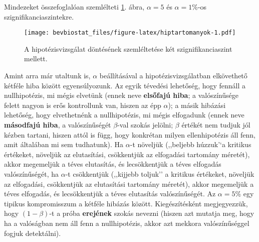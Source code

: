 \documentclass[]{book}
\begin{document}
Mindezeket összefoglalóan szemlélteti \ref{fig:hiptartomanyok}. ábra,
\(\alpha=5\) és \(\alpha=1\)\%-os szignifikanciaszintekre.

\begin{figure}
\centering
\texttt{[image: bevbiostat\_files/figure-latex/hiptartomanyok-1.pdf]}
\caption{\label{fig:hiptartomanyok}A hipotézisvizsgálat döntésének
szemléltetése két szignifikanciaszint mellett.}
\end{figure}

Amint arra már utaltunk is, \(\alpha\) beállításával a
hipotézisvizsgálatban elkövethető kétféle hiba között egyensúlyozunk. Az
egyik tévedési lehetőség, hogy fennáll a nullhipotézis, mi mégis
elvetünk (ennek neve \textbf{elsőfajú hiba}; a valószínűsége felett
nagyon is erős kontrollunk van, hiszen az épp \(\alpha\)); a másik
hibázási lehetőség, hogy elvethetnénk a nullhipotézis, mi mégis
elfogadunk (ennek neve \textbf{másodfajú hiba}, a valószínűségét
\(\beta\)-val szokás jelölni; \(\beta\) értékét nem tudjuk jól kézben
tartani, hiszen attól is függ, hogy konkrétan milyen ellenhipotézis áll
fenn, amit általában mi sem tudhatunk). Ha \(\alpha\)-t növeljük
(,,beljebb húzzuk'`a kritikus értékeket, növeljük az elutasítási,
csökkentjük az elfogadási tartomány méretét), akkor megemeljük a téves
elutasítás, és lecsökkentjük a téves elfogadás valószínűségét, ha
\(\alpha\)-t csökkentjük (,,kijjebb toljuk'' a kritikus értékeket,
növeljük az elfogadási, csökkentjük az elutasítási tartomány méretét),
akkor megemeljük a téves elfogadás, és lecsökkentjük a téves elutasítás
valószínűségét. Az \(\alpha=5\)\% egy tipikus kompromisszum a kétféle
hibázás között. Kiegészítésként megjegyezzük, hogy
\(\left(1-\beta\right)\)-t a próba \textbf{erejének} szokás nevezni
(hiszen azt mutatja meg, hogy ha a valóságban nem áll fenn a
nullhipotézis, akkor azt mekkora valószínűséggel fogjuk detektálni).
\end{document}

